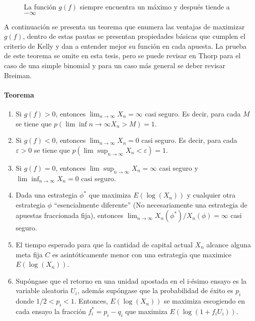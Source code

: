  \begin{figure}[!htb]\centering
    \begin {minipage}{0.65\textwidth}
      \caption{La función $g(f)$ siempre encuentra un máximo y después tiende a $-\infty$}\label{Fig:Gf}
    \end{minipage}
 \end{figure}
 
 A continuación se presenta un teorema que enumera las ventajas de maximizar $g(f)$, dentro de estas pautas se presentan propiedades básicas que cumplen el criterio de Kelly y dan a entender mejor su función en cada apuesta. La prueba de este teorema se omite en esta tesis, pero se puede revisar en Thorp\cite{thorp1969optimal} para el caso de una simple binomial y para un caso más general se deber revisar Breiman\cite{breiman1961optimal}.
 
\begin{itshape}

\paragraph{Teorema} %
\label{par:teorema}

\begin{enumerate}

	\item Si $g(f) > 0$, entonces $\lim_{n\to\infty}X_n = \infty$ casi seguro. Es decir, para cada $M$ se tiene que $p(\lim \inf{n\to\infty}X_n >M)=1$.

	\item Si $g(f) < 0$, entonces $\lim_{n\to\infty}X_n = 0$ casi seguro. Es decir, para cada $\varepsilon > 0 $ se tiene que $p(\lim \sup_{n\to\infty}X_n <\varepsilon)=1$.
	
	\item Si $g(f) = 0$, entonces $\lim \sup_{n\to\infty}X_n = \infty$ casi seguro y $\lim \inf_{n\to\infty}X_n = 0$ casi seguro.

	\item Dada una estrategia $\phi^*$ que maximiza $E(\log(X_n))$ y cualquier otra estrategia $\phi$ ``esencialmente diferente'' (No necesariamente una estrategia de apuestas fraccionada fija), entonces $\lim_{n\to\infty}X_n(\phi^*)/X_n(\phi)=\infty$ casi seguro.

	\item El tiempo esperado para que la cantidad de capital actual $X_n$ alcance alguna meta fija $C$ es asintóticamente menor con una estrategia que maximice $E(\log(X_n))$.

	\item Supóngase que el retorno en una unidad apostada en el i-ésimo ensayo es la variable aleatoria $U_i$, además supóngase que la probabilidad de éxito es $p_i$ donde $1/2 < p_i < 1$. Entonces, $E(\log(X_n))$ se maximiza escogiendo en cada ensayo la fracción $f_i^* = p_i -q_i$ que maximiza $E(\log(1+f_iU_i))$.

\end{enumerate}
\end{itshape}

